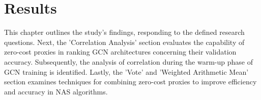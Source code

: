 \chapter{Results}\label{results}
\begin{comment}
In this chapter, we present the results of our investigation into the use of zero-cost proxies in neural architecture search (\gls{NAS}) for graph convolutional networks (\gls{GCN}). We address three research questions about using proxies in \gls{NAS} for \gls{GCN}, as outlined in the introduction chapter (\ref{section:goalsandrq}). Specifically, we analyze the effectiveness of different zero-cost proxies in ranking \gls{GCN} architectures, examine the impact of incorporating proxies in the \gls{NAS} algorithm and investigate the effectiveness of using an ensemble of proxies in \gls{NAS}.
\end{comment}

\begin{comment}
Chapter 5 of the thesis presents the results of an investigation into the use of zero-cost proxies in neural architecture search for graph convolutional networks. The chapter includes a section on correlation and a vote section that analyze the effectiveness of different zero-cost proxies in ranking \gls{GCN} architectures. Additionally, a section on supervised learning using Recursive Feature Elimination with Cross-Validation and Pointwise Ranking with Regression and Cross-Validation is included. Finally, the chapter addresses three research questions about the use of proxies in \gls{NAS} for \gls{GCN} and examines the impact of incorporating proxies in the \gls{NAS} algorithm and investigates the effectiveness of using an ensemble of proxies in \gls{NAS}.
\end{comment}

This chapter outlines the study's findings, responding to the defined research questions. Next, the 'Correlation Analysis' section evaluates the capability of zero-cost proxies in ranking \gls{GCN} architectures concerning their validation accuracy. Subsequently, the analysis of correlation during the warm-up phase of \gls{GCN} training is identified. Lastly, the 'Vote' and 'Weighted Arithmetic Mean' section examines techniques for combining zero-cost proxies to improve efficiency and accuracy in \gls{NAS} algorithms.









%


